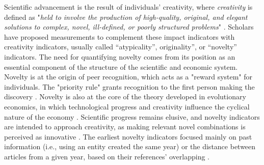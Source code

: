 Scientific advancement is the result of individuals' creativity, where \textit{creativity} is defined as "\textit{held to involve the production of high-quality, original, and elegant solutions to complex, novel, ill-defined, or poorly structured problems}" \citep{hemlin2013leadership}.
Scholars have proposed measurements to complement these impact indicators with creativity indicators, usually called ``atypicality'', originality'', or ``novelty'' indicators. The need for quantifying novelty comes from its position as an essential component of the structure of the scientific and economic system. Novelty is at the origin of peer recognition, which acts as a "reward system" for individuals. The "priority rule" grants recognition to the first person making the discovery \citep{merton1957priorities, carayol2019}. Novelty is also at the core of the theory developed in evolutionary economics, in which technological progress and creativity influence the cyclical nature of the economy \citep{schumpeter1939business,nelson1985evolutionary,amendola2014novelty}. Scientific progress remains elusive, and novelty indicators are intended to approach creativity, as making relevant novel combinations is perceived as innovative \citep{burt2004structural,rodriguez2016research,bornmann2019do}. The earliest novelty indicators focused mainly on past information (i.e., using an entity created the same year) or the distance between articles from a given year, based on their references' overlapping \citep{dahlin2005invention}.

